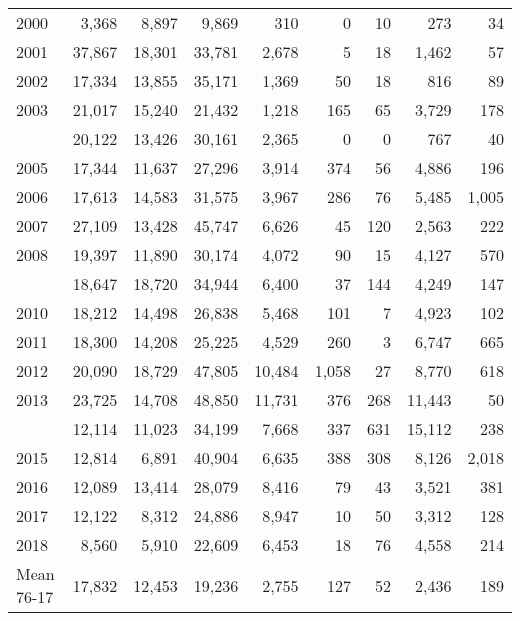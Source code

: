 \documentclass[]{article}
\begin{document}
\begin{table}
\begin{tabular}[t]{lrrrrrrrr}
2000 & 3,368 & 8,897 & 9,869 & 310 & 0 & 10 & 273 & 34\\
2001 & 37,867 & 18,301 & 33,781 & 2,678 & 5 & 18 & 1,462 & 57\\
2002 & 17,334 & 13,855 & 35,171 & 1,369 & 50 & 18 & 816 & 89\\
2003 & 21,017 & 15,240 & 21,432 & 1,218 & 165 & 65 & 3,729 & 178\\
\addlinespace
2004 & 20,122 & 13,426 & 30,161 & 2,365 & 0 & 0 & 767 & 40\\
2005 & 17,344 & 11,637 & 27,296 & 3,914 & 374 & 56 & 4,886 & 196\\
2006 & 17,613 & 14,583 & 31,575 & 3,967 & 286 & 76 & 5,485 & 1,005\\
2007 & 27,109 & 13,428 & 45,747 & 6,626 & 45 & 120 & 2,563 & 222\\
2008 & 19,397 & 11,890 & 30,174 & 4,072 & 90 & 15 & 4,127 & 570\\
\addlinespace
2009 & 18,647 & 18,720 & 34,944 & 6,400 & 37 & 144 & 4,249 & 147\\
2010 & 18,212 & 14,498 & 26,838 & 5,468 & 101 & 7 & 4,923 & 102\\
2011 & 18,300 & 14,208 & 25,225 & 4,529 & 260 & 3 & 6,747 & 665\\
2012 & 20,090 & 18,729 & 47,805 & 10,484 & 1,058 & 27 & 8,770 & 618\\
2013 & 23,725 & 14,708 & 48,850 & 11,731 & 376 & 268 & 11,443 & 50\\
\addlinespace
2014 & 12,114 & 11,023 & 34,199 & 7,668 & 337 & 631 & 15,112 & 238\\
2015 & 12,814 & 6,891 & 40,904 & 6,635 & 388 & 308 & 8,126 & 2,018\\
2016 & 12,089 & 13,414 & 28,079 & 8,416 & 79 & 43 & 3,521 & 381\\
2017 & 12,122 & 8,312 & 24,886 & 8,947 & 10 & 50 & 3,312 & 128\\
2018 & 8,560 & 5,910 & 22,609 & 6,453 & 18 & 76 & 4,558 & 214\\
Mean 76-17 & 17,832 & 12,453 & 19,236 & 2,755 & 127 & 52 & 2,436 & 189\\
\bottomrule
\end{tabular}
\end{table}

\makeatletter
\setlength{\@fptop}{0pt} \makeatother
\end{document}
